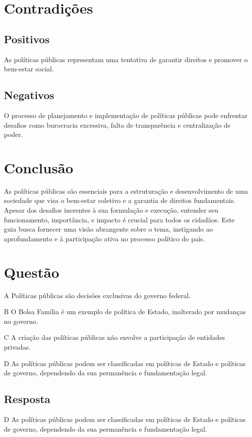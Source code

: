 \documentclass[
   article,       
   12pt,          
   oneside,       
   a4paper,       
   english,       
   brazil,        
   sumario=tradicional
   ]{abntex2}
\begin{document}
\section{Contradições}
\subsection{Positivos}
As políticas públicas representam uma tentativa de garantir direitos e promover o bem-estar social.
\subsection{Negativos}
O processo de planejamento e implementação de políticas públicas pode enfrentar desafios como burocracia excessiva, falta de transparência e centralização de poder.
\section{Conclusão}
As políticas públicas são essenciais para a estruturação e desenvolvimento de uma sociedade que visa o bem-estar coletivo e a garantia de direitos fundamentais. Apesar dos desafios inerentes à sua formulação e execução, entender seu funcionamento, importância, e impacto é crucial para todos os cidadãos. Este guia busca fornecer uma visão abrangente sobre o tema, instigando ao aprofundamento e à participação ativa no processo político do país.
\section{Questão}
\itemize
\item{A} Políticas públicas são decisões exclusivas do governo federal.
\item{B} O Bolsa Família é um exemplo de política de Estado, inalterado por mudanças no governo.
\item{C} A criação das políticas públicas não envolve a participação de entidades privadas.
\item{D} As políticas públicas podem ser classificadas em políticas de Estado e políticas de governo, dependendo da sua permanência e fundamentação legal.
\subsection{Resposta}
\item{D} As políticas públicas podem ser classificadas em políticas de Estado e políticas de governo, dependendo da sua permanência e fundamentação legal.

\postextual

\end{document}
